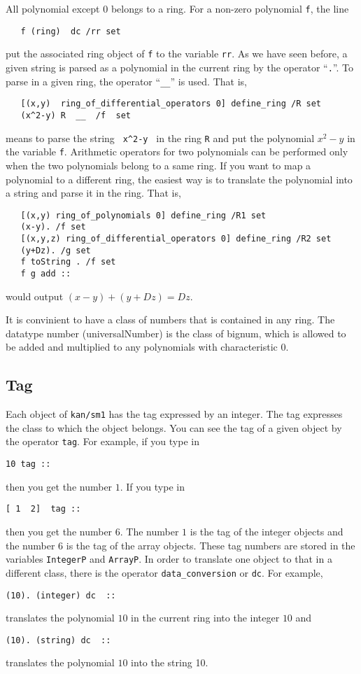 \documentclass{article}
\begin{document}
All polynomial except $0$ belongs to a ring.
For a non-zero polynomial {\tt f},
the line
\begin{verbatim}
   f (ring)  dc /rr set
\end{verbatim}
put the associated ring object of {\tt f} to the variable {\tt rr}.
As we have seen before,
a given string is parsed as a polynomial in the current ring by the operator
``{\tt .}''.
To parse in a given ring,
the operator ``{\tt \_\_}'' is used.
That is,
\begin{verbatim}
   [(x,y)  ring_of_differential_operators 0] define_ring /R set
   (x^2-y) R  __  /f  set
\end{verbatim}
means to parse the string \verb! x^2-y ! in the ring {\tt R}
and put the polynomial $x^2-y$ in the variable {\tt f}.
Arithmetic operators for two polynomials can be performed only
when the two polynomials belong to a same ring.
If you want to map a polynomial to a different ring,
the easiest way is to translate the polynomial into a string and
parse it in the ring.
That is,
\begin{verbatim}
   [(x,y) ring_of_polynomials 0] define_ring /R1 set
   (x-y). /f set
   [(x,y,z) ring_of_differential_operators 0] define_ring /R2 set
   (y+Dz). /g set
   f toString . /f set
   f g add ::
\end{verbatim}
would output
$ (x-y) + (y+Dz) = Dz$.

It is convinient to have a class of numbers that is contained in
any ring.
The datatype number (universalNumber) is the class of bignum, which is
allowed to be added and multiplied to any polynomials with characteristic 0.

\subsection{Tag}
Each object of {\tt kan/sm1} has the tag expressed by an integer.
The tag expresses the class to which the object belongs.
You can see the tag of a given object by the operator {\tt tag}.
For example, if you type in
\begin{verbatim}
10 tag ::
\end{verbatim}
then you get the number $1$.
If you type in
\begin{verbatim}
[ 1  2]  tag ::
\end{verbatim}
then you get the number $6$.
The number $1$ is the tag of the integer objects and
the number $6$ is the tag of the array objects.
These tag numbers are stored in the variables
{\tt IntegerP} and {\tt ArrayP}.
In order to translate one object to that in a different class,
there is the operator {\tt data\_conversion} or {\tt dc}.
For example,
\begin{verbatim}
(10). (integer) dc  ::
\end{verbatim}
translates the polynomial $10$ in the current ring into the integer $10$
and
\begin{verbatim}
(10). (string) dc  ::
\end{verbatim}
translates the polynomial $10$ into the string 10.
\end{document}
